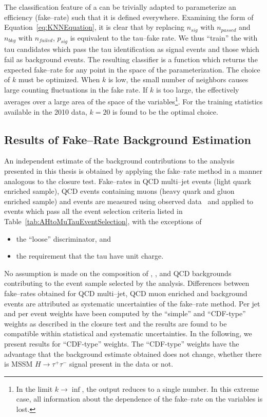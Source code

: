 The classification feature of a \kNN can be trivially adapted to parameterize an
efficiency (fake--rate) such that it is defined everywhere.  Examining the form
of Equation~\ref{eq:KNNEquation}, it is clear that by replacing $n_{sig}$ with
$n_{passed}$ and $n_{bkg}$ with $n_{failed}$, $p_{sig}$ is equivalent to the
tau--fake rate.  We thus ``train'' the \kNN with tau candidates which pass the
tau identification as signal events and those which fail as background events.
The resulting classifier is a function which returns the expected fake--rate for
any point in the space of the parameterization.  The choice of $k$ must be
optimized.  When $k$ is low, the small number of neighbors causes large counting
fluctuations in the fake rate.  If $k$ is too large, the \kNN effectively
averages over a large area of the space of the variables\footnote{In the limit
$k\to\inf$, the \kNN output reduces to a single number.  In this extreme case,
all information about the dependence of the fake--rate on the variables is
lost.}.  For the training statistics available in the 2010 data, $k=20$ is found
to be the optimal choice.

\subsection{Results of Fake--Rate Background Estimation}
%
An independent estimate of the background contributions to the analysis
presented in this thesis is obtained by applying the fake--rate method in a
manner analogous to the closure test.  Fake--rates in QCD multi--jet events
(light quark enriched sample), QCD events containing muons (heavy quark and
gluon enriched sample) and \WpJets events are measured using observed
data~\cite{CMS-PAS-PFT-10-004,CMS-PAS-TAU-11-001} and applied to events which
pass all the event selection criteria listed in
Table~\ref{tab:AHtoMuTauEventSelection}, with the exceptions of 
\begin{itemize}
  \item the ``loose'' \hpsTanc discriminator, and
  \item the requirement that the tau have unit charge.
\end{itemize}

No assumption is made on the composition of \ZMM, \WpJets,
\ttbarpJets and QCD backgrounds contributing to the event sample selected
by the analysis.  Differences between fake--rates obtained for QCD multi--jet,
QCD muon enriched and \WpJets background events are attributed as systematic
uncertainties of the fake--rate method.  Per jet and per event weights have been
computed by the ``simple'' and ``CDF-type'' weights as described
in the closure test and the results are found to be compatible within
statistical and systematic uncertainties.  In the following, we present results
for ``CDF-type'' weights.  The ``CDF-type'' weights have the advantage that the
background estimate obtained does not change, whether there is MSSM $H \to
\tau^{+} \tau^{-}$ signal present in the data or not.

